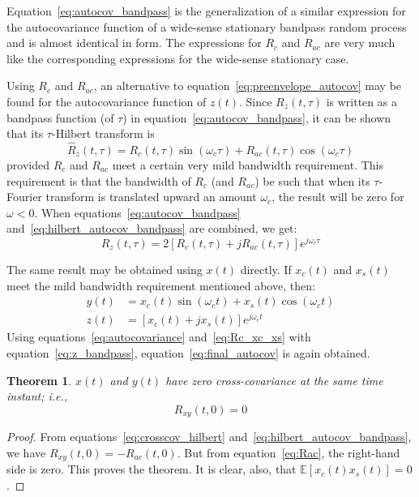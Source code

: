 \documentclass[12pt]{article}
\newtheorem{theorem}{Theorem}[section]
\begin{document}
Equation~\eqref{eq:autocov_bandpass} is the generalization of a similar expression for the autocovariance function of a wide-sense stationary bandpass random process and is almost identical in form. The expressions for $R_c$ and $R_{ac}$ are very much like the corresponding expressions for the wide-sense stationary case.

Using $R_c$ and $R_{ac}$, an alternative to equation~\eqref{eq:preenvelope_autocov} may be found for the autocovariance function of $z(t)$. Since $R_z(t, \tau)$ is written as a bandpass function (of $\tau$) in equation~\eqref{eq:autocov_bandpass}, it can be shown~\cite{urkowitz1962} that its $\tau$-Hilbert transform is
\begin{equation}
\hat{R}_z(t, \tau) = R_c(t, \tau) \sin(\omega_c \tau) + R_{ac}(t, \tau) \cos(\omega_c \tau)
\label{eq:hilbert_autocov_bandpass}
\end{equation}
provided $R_c$ and $R_{ac}$ meet a certain very mild bandwidth requirement. This requirement is that the bandwidth of $R_c$ (and $R_{ac}$) be such that when its $\tau$-Fourier transform is translated upward an amount $\omega_c$, the result will be zero for $\omega < 0$. When equations~\eqref{eq:autocov_bandpass} and~\eqref{eq:hilbert_autocov_bandpass} are combined, we get:
\begin{equation}
R_z(t, \tau) = 2\left[ R_c(t, \tau) + j R_{ac}(t, \tau) \right] e^{j\omega_c \tau}
\label{eq:final_autocov}
\end{equation}

The same result may be obtained using $x(t)$ directly. If $x_c(t)$ and $x_s(t)$ meet the mild bandwidth requirement mentioned above, then:
\begin{align}
y(t) &= x_c(t) \sin(\omega_c t) + x_s(t) \cos(\omega_c t) \label{eq:y_bandpass} \\
z(t) &= [x_c(t) + j x_s(t)] e^{j\omega_c t} \label{eq:z_bandpass}
\end{align}
Using equations~\eqref{eq:autocovariance} and~\eqref{eq:Rc_xc_xs} with equation~\eqref{eq:z_bandpass}, equation~\eqref{eq:final_autocov} is again obtained.

\begin{theorem}
\label{thm:zero_crosscov}
$x(t)$ and $y(t)$ have zero cross-covariance at the same time instant; i.e.,
\begin{equation}
R_{xy}(t, 0) = 0
\label{eq:zero_crosscov}
\end{equation}
\end{theorem}
\begin{proof}
From equations~\eqref{eq:crosscov_hilbert} and~\eqref{eq:hilbert_autocov_bandpass}, we have $R_{xy}(t, 0) = -R_{ac}(t, 0)$. But from equation~\eqref{eq:Rac}, the right-hand side is zero. This proves the theorem. It is clear, also, that $\mathbb{E}[x_c(t)x_s(t)] = 0$.
\end{proof}
\end{document}
